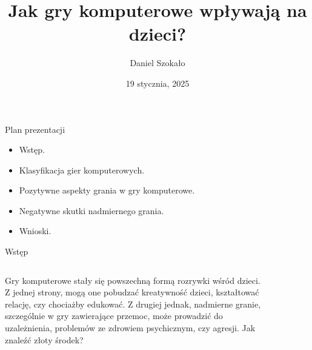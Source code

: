 \documentclass{beamer}
\title{Jak gry komputerowe wpływają na dzieci?} %
\author{Daniel Szokało}
\date{19 stycznia, 2025}
\begin{document}
\begin{frame}
    \titlepage
\end{frame}

\begin{frame}{Plan prezentacji} %
\begin{itemize}
    \item[\ding{107}] Wstęp.
    \item[\ding{107}] Klasyfikacja gier komputerowych.
    \item[\ding{107}] Pozytywne aspekty grania w gry komputerowe.
    \item[\ding{107}] Negatywne skutki nadmiernego grania.
    \item[\ding{107}] Wnioski.
\end{itemize}
\end{frame}

\begin{frame}{Wstęp} %
\begin{columns}
\begin{column}{0.5\textwidth}
Gry komputerowe stały się powszechną formą rozrywki wśród dzieci. Z jednej strony, mogą one pobudzać kreatywność dzieci, kształtować relację, czy chociażby edukować. Z drugiej jednak, nadmierne granie, szczególnie w gry zawierające przemoc, może prowadzić do uzależnienia, problemów ze zdrowiem psychicznym, czy agresji. Jak znaleźć złoty środek?

\end{column}
\begin{column}{0.5\textwidth}
    \begin{figure}
    \centering
        \includegraphics[width=6cm,height=4.5cm]{dziecko.jpg}
\end{figure}
\end{column}
\end{columns}
\end{frame}
\end{document}
